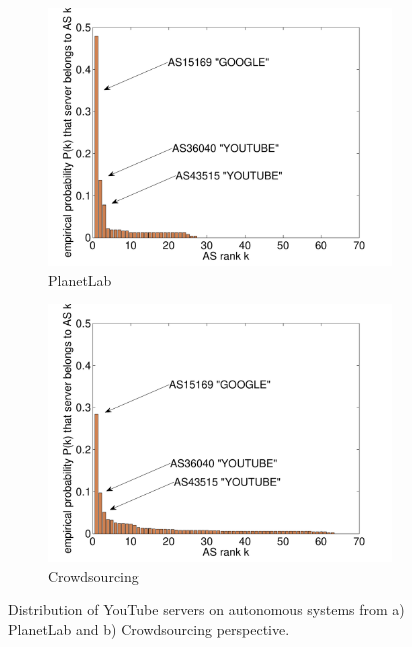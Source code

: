 \begin{figure}[bt]
    \centering
	\begin{subfigure}[t]{0.49\textwidth}
	\includegraphics[width=\textwidth]{aslevel/crowd/figs/valli_AS_pl_dst.pdf}
  \caption{PlanetLab}
	\label{fig:AS_pl_dst}
  \end{subfigure}
	\begin{subfigure}[t]{0.49\textwidth}
	\includegraphics[width=\textwidth]{aslevel/crowd/figs/valli_AS_mw_dst.pdf}
  \caption{Crowdsourcing}
 	\label{fig:AS_mw_dst}
  \end{subfigure}
    \caption{Distribution of YouTube servers on autonomous systems from a) PlanetLab and b) Crowdsourcing perspective.}
    \label{fig:AS_dst}
\end{figure}

